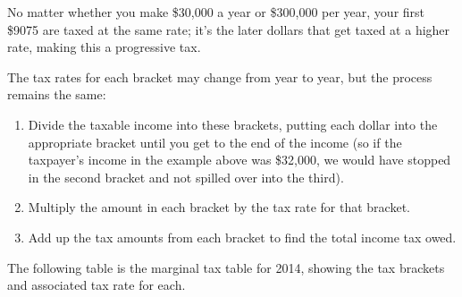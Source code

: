 No matter whether you make \$30,000 a year or \$300,000 per year, your first \$9075 are taxed at the same rate; it's the later dollars that get taxed at a higher rate, making this a progressive tax.

The tax rates for each bracket may change from year to year, but the process remains the same:
\begin{enumerate}
\item Divide the taxable income into these brackets, putting each dollar into the appropriate bracket until you get to the end of the income (so if the taxpayer's income in the example above was \$32,000, we would have stopped in the second bracket and not spilled over into the third).
\item Multiply the amount in each bracket by the tax rate for that bracket.
\item Add up the tax amounts from each bracket to find the total income tax owed.
\end{enumerate}

The following table is the marginal tax table for 2014, showing the tax brackets and associated tax rate for each.
\vspace{0.25in}

